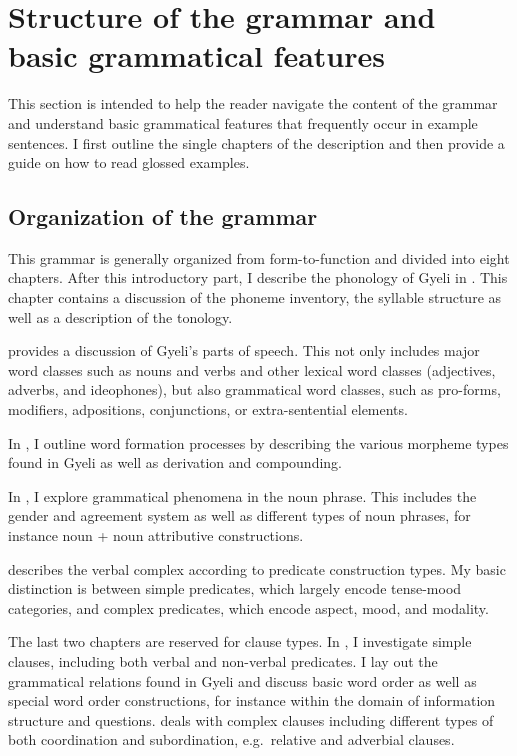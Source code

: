 



\section{Structure of the grammar and basic grammatical features}

This section is intended to help the reader navigate the content of the grammar and understand basic grammatical features that frequently occur in example sentences.  I first outline the single chapters of the description and then provide a guide on how to read glossed examples.


\subsection{Organization of the grammar}

This grammar is generally organized from form-to-function and divided into eight chapters. After this introductory part, I describe the phonology of Gyeli in . This chapter contains a discussion of the phoneme inventory, the syllable structure as well as a description of the tonology.

 provides a discussion of Gyeli's parts of speech. This not only includes major word classes such as nouns and verbs and other lexical word classes (adjectives, adverbs, and ideophones), but also grammatical word classes, such as pro-forms, modifiers, adpositions, conjunctions, or extra-sentential elements.

In , I outline word formation processes by describing the various morpheme types found in Gyeli as well as derivation and compounding.

In , I explore grammatical phenomena in the noun phrase. This includes the gender and agreement system as well as different types of noun phrases, for instance noun + noun attributive constructions.

 describes the verbal complex according to predicate construction types. My basic distinction is between simple predicates, which largely encode tense-mood categories, and complex predicates, which encode aspect, mood, and modality.

The last two chapters are reserved for clause types. In , I investigate simple clauses, including both verbal and non-verbal predicates. I lay out the grammatical relations found in Gyeli and discuss basic word order as well as special word order constructions, for instance within the domain of information structure and questions.  deals with complex clauses including different types of both coordination and subordination, e.g.\ relative and adverbial clauses. 

